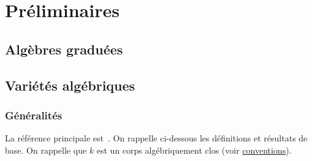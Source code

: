 \chapter{Préliminaires}

\section{Algèbres graduées}

\section{Variétés algébriques}

\subsection{Généralités}
La référence principale est~\cite{LAGSpringer}. On rappelle ci-dessous les définitions et résultats de base. On rappelle que $k$ est un corps algébriquement clos (voir \hyperref[sec:conventions]{conventions}).
